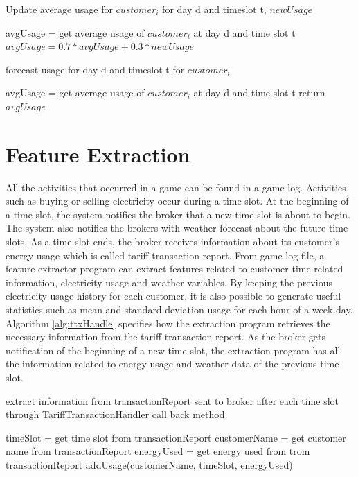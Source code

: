 \begin{algorithm}
\caption{Update average usage for $customer_i$ for day d and timeslot t, $newUsage$}
\begin{algorithmic} [1]
\STATE avgUsage = get average usage of $customer_i$ at day d and time slot t
\STATE $avgUsage = 0.7 * avgUsage + 0.3 * newUsage$
\end{algorithmic}
\label{alg:updateAvgMovingAvg}
\end{algorithm}

\begin{algorithm}
\caption{forecast usage for day d and timeslot t for $customer_i$}
\begin{algorithmic} [1]
\STATE avgUsage = get average usage of $customer_i$ at day d and time slot t 
\STATE return $avgUsage$
\end{algorithmic}
 \label{alg:predictAvgMovingAvg}
\end{algorithm}

\section{Feature Extraction}
	All the activities that occurred in a game can be found in a game log.  Activities such as buying or selling electricity occur during a time slot. At the beginning of a time slot, the system notifies the broker that a new time slot is about to begin. The system also notifies the brokers with weather forecast about the future time slots. As a time slot ends, the broker receives information about its customer's energy usage which is called tariff transaction report. From game log file, a feature extractor program can extract features related to customer time related information, electricity usage and weather variables. By keeping the previous electricity usage  history for each customer, it is also possible to generate useful statistics such as mean and standard deviation usage for each hour of a week day. Algorithm \ref{alg:ttxHandle} specifies how the extraction program retrieves the necessary information from the tariff transaction report. As the broker gets notification of the beginning of a new time slot, the extraction program has all the information related to energy usage and weather data of the previous time slot. 
\begin{algorithm}[!h]
\caption{extract information from transactionReport sent to broker after each time slot through TariffTransactionHandler call back method}
\begin{algorithmic} [1]
\STATE timeSlot = get time slot from transactionReport
\STATE customerName = get customer name from transactionReport
\STATE energyUsed = get energy used from trom transactionReport
\STATE addUsage(customerName, timeSlot, energyUsed)
\end{algorithmic}
 \label{alg:ttxHandle}
\end{algorithm}

